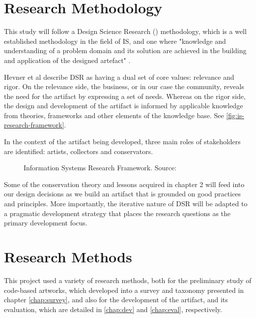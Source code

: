 \section{Research Methodology}
\label{sec:methodology}

This study will follow a Design Science Research () methodology, which is a well established methodology in the field of IS, and one where
"knowledge and understanding of a problem domain and its solution are achieved in the building and application of the designed artefact"  \cite[p.75]{hevnerDesignScienceInformation2004}.

Hevner et al \citeyear{hevnerDesignScienceInformation2004} describe DSR as having a dual set of core values: relevance and rigor. On the relevance side, the business, or in our case the community, reveals the need for the artifact by expressing a set of needs. Whereas on the rigor side, the design and development of the artifact is informed by applicable knowledge from theories, frameworks and other elements of the knowledge base. See \autoref{fig:is-research-framework}.

In the context of the artifact being developed, three main roles of stakeholders are identified: artists, collectors and conservators.

\begin{figure}[h]
    \centering
    
    \caption[Information Systems Research Framework]{Information Systems Research Framework. Source: \cite[p.80]{hevnerDesignScienceInformation2004}}
    \label{fig:is-research-framework}
\end{figure}

Some of the conservation theory and lessons acquired in chapter 2 will feed into our design decisions as we build an artifact that is grounded on good practices and principles.
More importantly, the iterative nature of DSR will be adapted to a pragmatic development strategy that places the research questions as the primary development focus.

\section{Research Methods}

This project used a variety of research methods, both for the preliminary study of code-based artworks, which developed into a survey and taxonomy presented in chapter \autoref{chap:survey}, and also for the development of the artifact, and its evaluation, which are detailed in \autoref{chap:dev} and \autoref{chap:eval}, respectively.

